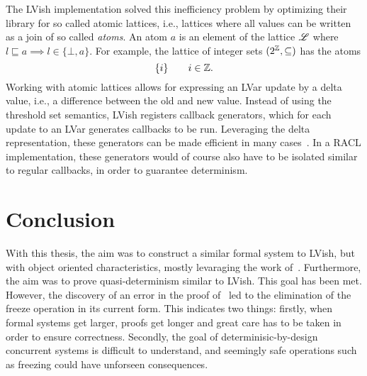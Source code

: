 The LVish implementation solved this inefficiency problem by optimizing their
library for so called atomic lattices, i.e., lattices where all values can be
written as a join of so called \emph{atoms}. An atom $a$ is an element of the
lattice $\mbox{$\mathscr{L}$}$ where $l \sqsubseteq a \implies l \in \{\bot, a\}$. For
example, the lattice of integer sets $(2^{\mathbb{Z}}, \subseteq)$ has the atoms
\begin{equation*}
  \{ i \} \quad\quad i \in \mathbb{Z}.
\end{equation*}
Working with atomic lattices allows for expressing an LVar update by a delta
value, i.e., a difference between the old and new value. Instead of using the
threshold set semantics, LVish registers callback generators, which for each
update to an LVar generates callbacks to be run. Leveraging the delta
representation, these generators can be made efficient in many
cases~\parencite{kuper2014freeze}. In a RACL implementation, these generators
would of course also have to be isolated similar to regular callbacks, in
order to guarantee determinism.


\section{Conclusion}%
\label{sec:conclusion}

With this thesis, the aim was to construct a similar formal system to LVish, but
with object oriented characteristics, mostly levaraging the work
of~\textcite{conf/oopsla/HallerL16}. Furthermore, the aim was to prove
quasi-determinism similar to LVish. This goal has been met.  However, the
discovery of an error in the proof of~\textcite{kuper2014freezeTR} led to the
elimination of the freeze operation in its current form. This indicates two
things: firstly, when formal systems get larger, proofs get longer and great
care has to be taken in order to ensure correctness. Secondly, the goal of
determinisic-by-design concurrent systems is difficult to understand, and
seemingly safe operations such as freezing could have unforseen consequences.





